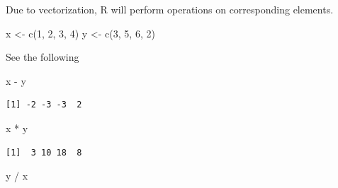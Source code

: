 \documentclass[
  letterpaper,
  DIV=11,
  numbers=noendperiod]{scrreprt}
\newenvironment{Shaded}{\begin{snugshade}}{\end{snugshade}}
\newcommand{\DecValTok}[1]{\textcolor[rgb]{0.68,0.00,0.00}{#1}}
\newcommand{\FunctionTok}[1]{\textcolor[rgb]{0.28,0.35,0.67}{#1}}
\newcommand{\NormalTok}[1]{\textcolor[rgb]{0.00,0.23,0.31}{#1}}
\newcommand{\OtherTok}[1]{\textcolor[rgb]{0.00,0.23,0.31}{#1}}
\newcommand{\SpecialCharTok}[1]{\textcolor[rgb]{0.37,0.37,0.37}{#1}}
\begin{document}
\begin{tcolorbox}[enhanced jigsaw, colbacktitle=quarto-callout-tip-color!10!white, opacitybacktitle=0.6, breakable, left=2mm, leftrule=.75mm, toprule=.15mm, toptitle=1mm, bottomtitle=1mm, colframe=quarto-callout-tip-color-frame, opacityback=0, coltitle=black, arc=.35mm, titlerule=0mm, colback=white, bottomrule=.15mm, title=\textcolor{quarto-callout-tip-color}{\faLightbulb}\hspace{0.5em}{Answer}, rightrule=.15mm]

Due to vectorization, R will perform operations on corresponding
elements.

\begin{Shaded}
\begin{Highlighting}[]
\NormalTok{x }\OtherTok{\textless{}{-}} \FunctionTok{c}\NormalTok{(}\DecValTok{1}\NormalTok{, }\DecValTok{2}\NormalTok{, }\DecValTok{3}\NormalTok{, }\DecValTok{4}\NormalTok{)}
\NormalTok{y }\OtherTok{\textless{}{-}} \FunctionTok{c}\NormalTok{(}\DecValTok{3}\NormalTok{, }\DecValTok{5}\NormalTok{, }\DecValTok{6}\NormalTok{, }\DecValTok{2}\NormalTok{)}
\end{Highlighting}
\end{Shaded}

See the following

\begin{Shaded}
\begin{Highlighting}[]
\NormalTok{x }\SpecialCharTok{{-}}\NormalTok{ y}
\end{Highlighting}
\end{Shaded}

\begin{verbatim}
[1] -2 -3 -3  2
\end{verbatim}

\begin{Shaded}
\begin{Highlighting}[]
\NormalTok{x }\SpecialCharTok{*}\NormalTok{ y}
\end{Highlighting}
\end{Shaded}

\begin{verbatim}
[1]  3 10 18  8
\end{verbatim}

\begin{Shaded}
\begin{Highlighting}[]
\NormalTok{y }\SpecialCharTok{/}\NormalTok{ x}
\end{Highlighting}
\end{Shaded}


\end{tcolorbox}
\end{document}

